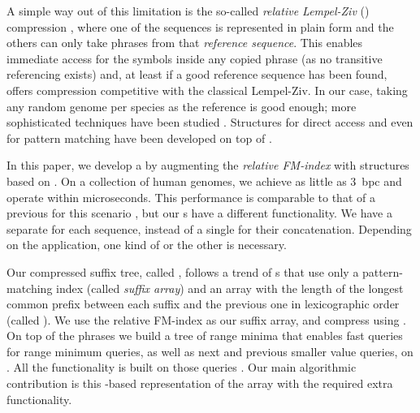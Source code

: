 A simple way out of this limitation is the so-called \emph{relative Lempel-Ziv}
(\RLZ) compression \cite{Kuruppu2010}, where one of the sequences is represented
in plain form and the others can only take phrases from that \emph{reference
sequence}. This enables immediate access for the symbols inside any copied
phrase (as no transitive referencing exists) and, at least if a good reference
sequence has been found, offers compression competitive with the
classical Lempel-Ziv. In our case, taking any random genome per species as the
reference is good enough; more sophisticated techniques have been studied
\cite{KPZ11}. Structures for direct access \cite{DG11,Ferrada2014}
and even for pattern matching \cite{DJSS14,Belazzougui2014} have been developed
on top of \RLZ.

In this paper, we develop a \CST{} by augmenting the \emph{relative FM-index}
\cite{Belazzougui2014} with structures based on \RLZ.
On a collection of human genomes, we achieve as little as 3~bpc and operate
within microseconds. This performance is comparable to that of a previous \CST{}
for this scenario \cite{Navarro2015}, but our \CST{}s have a different
functionality. We have a separate \CST{} for each sequence, instead of a single
\CST{} for their concatenation. Depending on the application, one kind of \CST{} or
the other is necessary.

Our compressed suffix tree, called \RCST, follows a trend of \CST{}s
\cite{Fischer2009a,Ohlebusch2009,Ohlebusch2010,Gog2011a,Abeliuk2013} that use only a pattern-matching index
(called \emph{suffix array}) and an array with the length of the longest common prefix
between each suffix and the previous one in lexicographic order (called \LCP).
We use the relative FM-index as our suffix array, and
compress \LCP{} using \RLZ. On top of the \RLZ{} phrases we build a tree
of range minima that enables fast queries for range minimum queries, as well as
next and previous smaller value queries, on \LCP{} \cite{Abeliuk2013}. All the \CST{} functionality
is built on those queries \cite{Fischer2009a}. Our main algorithmic contribution
is this \RLZ\nobreakdash-based representation of the \LCP{} array with the required extra
functionality.
